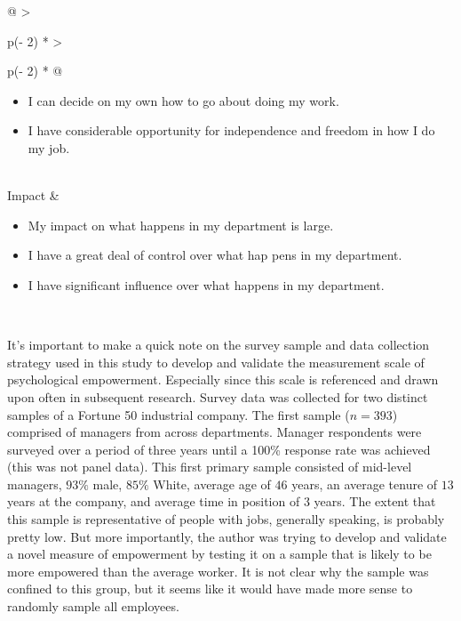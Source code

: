 \documentclass[
  11pt,
  a4paper,
]{article}
\providecommand{\tightlist}{%
  \setlength{\itemsep}{0pt}\setlength{\parskip}{0pt}}\usepackage{longtable,booktabs,array}
\begin{document}
\begin{longtable}[]{@{}
  >{\raggedright\arraybackslash}p{(\columnwidth - 2\tabcolsep) * }
  >{\raggedright\arraybackslash}p{(\columnwidth - 2\tabcolsep) * }@{}}
\begin{minipage}[t]{\linewidth}
\begin{itemize}
  I have significant autonomy in determining how I do my job.
\item
  I can decide on my own how to go about doing my work.
\item
  I have considerable opportunity for independence and freedom in how I
  do my job.
\end{itemize}
\end{minipage} \\
Impact & \begin{minipage}[t]{\linewidth}\raggedright
\begin{itemize}
\tightlist
\item
  My impact on what happens in my department is large.
\item
  I have a great deal of control over what hap pens in my department.
\item
  I have significant influence over what happens in my department.
\end{itemize}
\end{minipage} \\
\end{longtable}

It's important to make a quick note on the survey sample and data
collection strategy used in this study to develop and validate the
measurement scale of psychological empowerment. Especially since this
scale is referenced and drawn upon often in subsequent research. Survey
data was collected for two distinct samples of a Fortune 50 industrial
company. The first sample (\(n = 393\)) comprised of managers from
across departments. Manager respondents were surveyed over a period of
three years until a 100\% response rate was achieved (this was not panel
data). This first primary sample consisted of mid-level managers,
\(93\%\) male, \(85\%\) White, average age of \(46\) years, an average
tenure of \(13\) years at the company, and average time in position of
\(3\) years. The extent that this sample is representative of people
with jobs, generally speaking, is probably pretty low. But more
importantly, the author was trying to develop and validate a novel
measure of empowerment by testing it on a sample that is likely to be
more empowered than the average worker. It is not clear why the sample
was confined to this group, but it seems like it would have made more
sense to randomly sample all employees.
\end{document}
